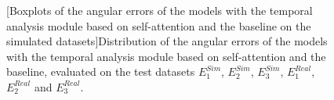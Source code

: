 \begin{figure}[t]
    \centering
    
    [Boxplots of the angular errors of the models with the temporal analysis module based on self-attention and the baseline on the simulated datasets]{Distribution of the angular errors of the models with the temporal analysis module based on self-attention and the baseline, evaluated on the test datasets $E^{Sim}_1$, $E^{Sim}_2$, $E^{Sim}_3$, $E^{Real}_1$, $E^{Real}_2$ and $E^{Real}_3$.}
    \label{fig:boxplots_multiLoca_selfAttention}
\end{figure}

